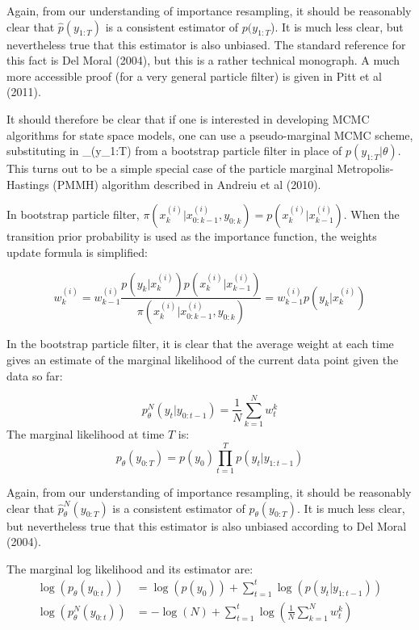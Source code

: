 \documentclass[11pt,a4,twosided,singlespacing,titlepagenumber=on]{scrreprt}
\numberwithin{equation}{chapter} %
\theoremstyle{remark}
\begin{document}
Again, from our understanding of importance resampling, it should be reasonably clear that $\hat{p}(y_{1:T})$ is a consistent estimator of ${p}(y_{1:T}$). It is much less clear, but nevertheless true that this estimator is also unbiased. The standard reference for this fact is Del Moral (2004), but this is a rather technical monograph. A much more accessible proof (for a very general particle filter) is given in Pitt et al (2011).

It should therefore be clear that if one is interested in developing MCMC algorithms for state space models, one can use a pseudo-marginal MCMC scheme, substituting in _\theta(y_{1:T}) from a bootstrap particle filter in place of $p(y_{1:T}|\theta)$. This turns out to be a simple special case of the particle marginal Metropolis-Hastings (PMMH) algorithm described in Andreiu et al (2010). 

In bootstrap particle filter, $\pi(x_k^{(i)} | x_{0:k-1}^{(i)}, y_{0:k}) = p(x_k^{(i)}|x_{k-1}^{(i)})$. When the transition prior probability is used as the importance function, the weights update formula is simplified:

$$
w_k^{(i)} = w_{k-1}^{(i)} \frac{p(y_k|x_k^{(i)})p(x_k^{(i)}|x^{(i)}_{k-1})}{\pi(x_k^{(i)}|x^{(i)}_{0:k-1},y_{0:k})}= w_{k-1}^{(i)} p(y_k|x_k^{(i)})
$$ 

In the bootstrap particle filter, it is clear that the average weight at each time gives an estimate of the marginal likelihood of the current data point given the data so far:

$$ p^N_{\theta}(y_t | y_{0:t-1}) = \frac{1}{N} \sum_{k=1}^N w_t^k$$
The marginal likelihood at time $T$ is:
$$ p_{\theta}(y_{0:T}) = p(y_0)\prod_{t=1}^T p(y_t | y_{1:t-1})$$

Again, from our understanding of importance resampling, it should be reasonably clear that $\hat{p}^N_{\theta}(y_{0:T})$ is a consistent estimator of $p_{\theta}(y_{0:T})$. It is much less clear, but nevertheless true that this estimator is also unbiased according to Del Moral (2004).

The marginal log likelihood and its estimator are:
\begin{align*}
\log(p_{\theta}(y_{0:t})) &= \log(p(y_0)) + \sum_{t=1}^t \log \left(p(y_t | y_{1:t-1}) \right) \\
\log(p^N_{\theta}(y_{0:t})) &= - \log(N) + \sum_{t=1}^t \log \left(\frac{1}{N} \sum_{k=1}^N w_t^k \right)
\end{align*}
\end{document}
